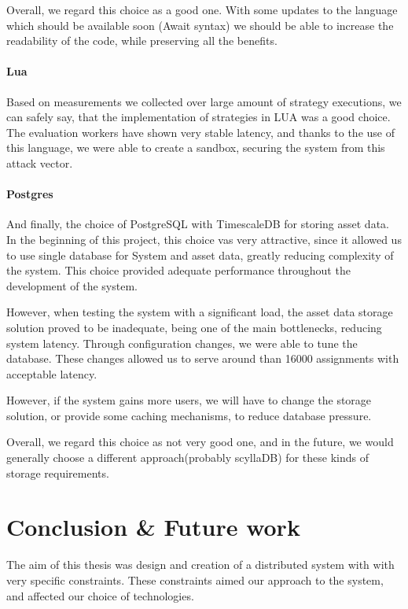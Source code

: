 Overall, we regard this choice as a good one. With some updates to the language which should be available soon (Await syntax)
we should be able to increase the readability of the code, while preserving all the benefits.

\subsubsection{Lua}
Based on measurements we collected over large amount of strategy executions, we can safely say, that the implementation
of strategies in LUA was a good choice. The evaluation workers have shown very stable latency, and thanks to the use of this language,
we were able to create a sandbox, securing the system from this attack vector.

\subsubsection{Postgres}
And finally, the choice of PostgreSQL with TimescaleDB for storing asset data. In the beginning of this project, this choice vas very attractive,
since it allowed us to use single database for System and asset data, greatly reducing complexity of the system.
This choice provided adequate performance throughout the development of the system.

However, when testing the system with a significant load, the asset data storage solution proved to be inadequate, being
one of the main bottlenecks, reducing system latency. Through configuration changes, we were able to tune the database. These
changes allowed us to serve around than 16000 assignments with acceptable latency.

However, if the system gains more users, we will have to change the storage solution, or provide some caching mechanisms,
to reduce database pressure.

Overall, we regard this choice as not very good one, and in the future, we would generally choose a different approach(probably
scyllaDB) for these kinds of storage requirements.

\chapter{Conclusion \& Future work}
The aim of this thesis was design and creation of a distributed system with with very specific constraints.
These constraints aimed our approach to the system, and affected our choice of technologies.

